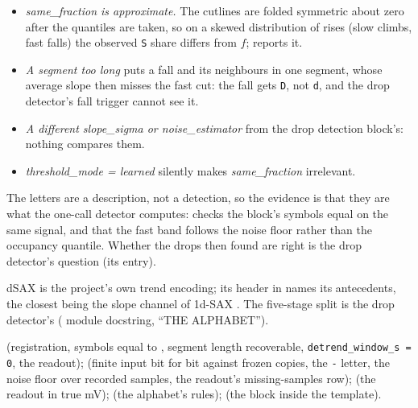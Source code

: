 \begin{itemize}
\item \emph{same\_fraction is approximate.} The cutlines are folded symmetric about zero after
  the quantiles are taken, so on a skewed distribution of rises (slow climbs, fast falls) the
  observed \texttt{S} share differs from $f$;  reports it.
\item \emph{A segment too long} puts a fall and its neighbours in one segment, whose average
  slope then misses the fast cut: the fall gets \texttt{D}, not \texttt{d}, and the drop
  detector's fall trigger cannot see it.
\item \emph{A different \emph{slope\_sigma} or \emph{noise\_estimator}} from the drop
  detection block's: nothing compares them.
\item \emph{threshold\_mode = learned} silently makes \emph{same\_fraction} irrelevant.
\end{itemize}

The letters are a description, not a detection, so the evidence is that they are what the
one-call detector computes:  checks the block's
symbols equal  on the same signal, and 
that the fast band follows the noise floor rather than the occupancy quantile. Whether the
drops then found are right is the drop detector's question (its entry).

dSAX is the project's own trend encoding; its header in
 names its antecedents, the closest being the
slope channel of 1d-SAX \citep{malinowski2013onedsax}. The five-stage split is the drop
detector's ( module docstring, ``THE ALPHABET'').

 (registration, symbols equal to
, segment length recoverable, \texttt{detrend\_window\_s = 0}, the
readout);  (finite input bit for bit against frozen
copies, the \texttt{-} letter, the noise floor over recorded samples, the readout's
missing-samples row);  (the readout in true mV);
 (the alphabet's rules);
 (the block inside the template).
